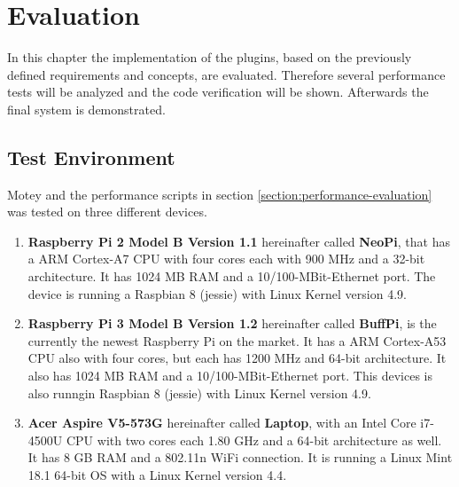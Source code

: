 \chapter{Evaluation}
\label{chapter:evaluation}
\minitoc\vspace{.5cm}
In this chapter the implementation of the plugins, based on the previously defined requirements and concepts, are evaluated.
Therefore several performance tests will be analyzed and the code verification will be shown.
Afterwards the final system is demonstrated.

\section{Test Environment}
\label{section:test-environment}
Motey and the performance scripts in section \ref{section:performance-evaluation} was tested on three different devices.
\begin{enumerate}
  \item \textbf{Raspberry Pi 2 Model B Version 1.1} hereinafter called \textbf{NeoPi}, that has a ARM Cortex-A7 \ac{CPU} with four cores each with 900 MHz and a 32-bit architecture. It has 1024 MB \ac{RAM} and a 10/100-MBit-Ethernet port. The device is running a Raspbian 8 (jessie) with Linux Kernel version 4.9.
  \item \textbf{Raspberry Pi 3 Model B Version 1.2} hereinafter called \textbf{BuffPi}, is the currently the newest Raspberry Pi on the market. It has a ARM Cortex-A53 \ac{CPU} also with four cores, but each has 1200 MHz and 64-bit architecture. It also has 1024 MB \ac{RAM} and a 10/100-MBit-Ethernet port.  This devices is also runngin Raspbian 8 (jessie) with Linux Kernel version 4.9.
  \item \textbf{Acer Aspire V5-573G} hereinafter called \textbf{Laptop}, with an Intel Core i7-4500U \ac{CPU} with two cores each 1.80 GHz and a 64-bit architecture as well. It has 8 GB \ac{RAM} and a 802.11n WiFi connection. It is running a Linux Mint 18.1  64-bit \ac{OS} with a Linux Kernel version 4.4.
\end{enumerate}


